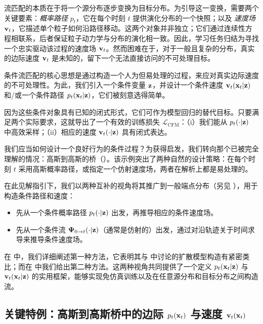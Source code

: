 流匹配的本质在于将一个源分布逐步变换为目标分布。为引导这一变换，需要两个关键要素：\emph{概率路径} $p_{t}$，它在每个时刻 $t$ 提供演化分布的一个快照；以及 \emph{速度场} ${\mathbf{v}}_{t}$，它描述单个粒子如何沿路径移动。这两个对象并非独立；它们通过连续性方程相联系，后者保证粒子动力学与分布的演化相一致。因此，学习任务归结为寻找一个忠实驱动该过程的速度场 ${\mathbf{v}}_t$。然而困难在于，对于一般且复杂的分布，真实的边际速度 ${\mathbf{v}}_t$ 是未知的，留下一个无法直接访问的不可处理目标。

条件流匹配的核心思想是通过构造一个人为但易处理的过程，来应对真实边际速度的不可处理性。为此，我们引入一个条件变量 ${\mathbf{z}}$，并设计一个条件速度 ${\mathbf{v}}_t({\mathbf{x}}_t|{\mathbf{z}})$ 和/或一个条件路径 $p_t({\mathbf{x}}_t|{\mathbf{z}})$，它们被刻意选得简单。

 因为这些条件对象具有已知的闭式形式，它们可作为模型回归的替代目标。只要满足两个实际要求，这就导出了一个有效的训练损失 $\mathcal{L}_{\mathrm{CFM}}$：（i）我们能从 $p_t(\cdot|{\mathbf{z}})$ 中高效采样；（ii）相应的速度 ${\mathbf{v}}_t(\cdot|{\mathbf{z}})$ 具有闭式表达。


我们应当如何设计一个良好行为的条件过程？为获得启发，我们转向那个已被完全理解的情况：高斯到高斯的桥（）。该示例突出了两种自然的设计策略：在每个时刻 $t$ 采用高斯概率路径，或指定一个仿射速度场，两者在解析上都是易处理的。

在此见解指引下，我们以两种互补的视角将其推广到一般端点分布（另见 ），用于构造条件路径和速度：
\begin{itemize}
    \item {}先从一个条件概率路径 $p_t(\cdot|{\mathbf{z}})$ 出发，再推导相应的条件速度场。
    \item {}先从一个条件流 ${\bm{\Psi}}_{0\to t}(\cdot|{\mathbf{z}})$（通常是仿射的）出发，通过对沿轨迹关于时间求导来推导条件速度场。
\end{itemize}


在  中，我们详细阐述第一种方法，它表明其与  中讨论的扩散模型构造有紧密类比；而在  中我们给出第二种方法。这两种视角共同提供了一个定义 $p_t({\mathbf{x}}_t| {\mathbf{z}})$ 与 ${\mathbf{v}}_t({\mathbf{x}}_t| {\mathbf{z}})$ 的实用框架，能够实现免仿真训练以及在任意源分布和目标分布之间构造流。





\subsection{关键特例：高斯到高斯桥中的边际 $p_t({\mathbf{x}}_t)$ 与速度 ${\mathbf{v}}_t({\mathbf{x}}_t)$}\label{subsec:special-fm-instantiations}

